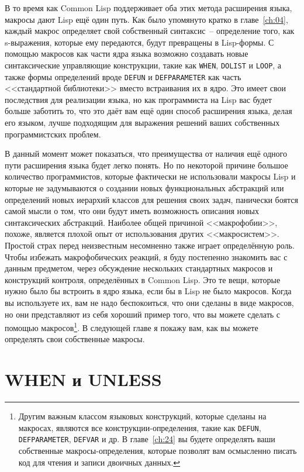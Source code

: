 В то время как Common Lisp поддерживает оба этих метода расширения языка, макросы дают
Lisp ещё один путь.  Как было упомянуто кратко в главе~\ref{ch:04}, каждый макрос определяет свой
собственный синтаксис~-- определение того, как s-выражения, которые ему передаются, будут
превращены в Lisp-формы. С помощью макросов как части ядра языка возможно создавать
новые синтаксические управляющие конструкции, такие как \lstinline{WHEN}, \lstinline{DOLIST} и
\lstinline{LOOP}, а также формы определений вроде \lstinline{DEFUN} и \lstinline{DEFPARAMETER} как
часть <<стандартной библиотеки>> вместо встраивания их в ядро. Это имеет свои последствия
для реализации языка, но как программиста на Lisp вас будет больше заботить то, что это
даёт вам ещё один способ расширения языка, делая его языком, лучше подходящим для
выражения решений ваших собственных программистских проб\-лем.

В данный момент может показаться, что преимущества от наличия ещё одного пути расширения
языка будет легко понять. Но по некоторой причине большое количество программистов,
которые фактически не использовали макросы Lisp и которые не задумываются о создании новых
функциональных абстракций или определений новых иерархий классов для решения своих задач,
панически боятся самой мысли о том, что они будут иметь возможность описания новых
синтаксических абстракций. Наиболее общей причиной <<макрофобии>>, похоже, является плохой
опыт от использования других <<макросистем>>. Простой страх перед неизвестным несомненно
также играет определённую роль. Чтобы избежать макрофобических реакций, я буду постепенно
знакомить вас с данным предметом, через обсуждение нескольких стандартных макросов и
конструкций контроля, определённых в Common Lisp. Это те вещи, которые нужно было бы
встроить в ядро языка, если бы в Lisp не было макросов. Когда вы используете их, вам не
надо беспокоиться, что они сделаны в виде макросов, но они представляют из себя хороший
пример того, что вы можете сделать с помощью макросов\footnote{Другим важным классом
  языковых конструкций, которые сделаны на макросах, являются все конструкции-определения,
  такие как \lstinline{DEFUN}, \lstinline{DEFPARAMETER}, \lstinline{DEFVAR} и др. В
  главе~\ref{ch:24} вы будете определять ваши собственные макросы-определения, которые
  позволят вам осмысленно писать код для чтения и записи двоичных данных.}. В следующей
главе я покажу вам, как вы можете определять свои собственные макросы.

\section{WHEN и UNLESS}

